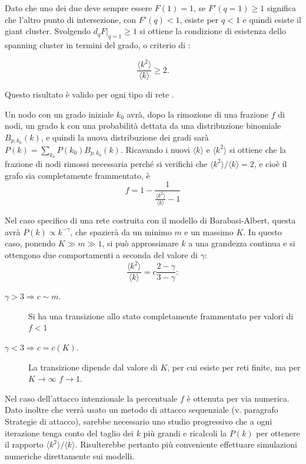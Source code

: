 Dato che uno dei due deve sempre essere $F(1)=1$, se $F'(q=1) \geq 1$ significa che l'altro punto di intersezione, con $F'(q) < 1$, esiste per $q < 1$ e quindi esiste il giant cluster. Svolgendo $d_qF|_{q=1} \geq 1$ si ottiene la condizione di esistenza dello spanning cluster in termini del grado, o criterio di \textcite{Molloy1995}:

\begin{equation}
\label{eq:criterion}
	\frac{\langle k^2\rangle}{\langle k \rangle}\geq 2.
\end{equation}

Questo risultato \`e valido per ogni tipo di rete \parencite{Cohen2000}. 

Un nodo con un grado iniziale $k_0$ avrà, dopo la rimozione di una frazione $f$ di nodi, un grado k con una probabilità dettata da una distribuzione binomiale $B_{p,k_0}(k)$, e quindi la nuova distribuzione dei gradi sarà $P(k) = \sum_{k_0} P(k_0)B_{p,k_0}(k)$. Ricavando i nuovi $\langle k \rangle$ e $\langle k^2 \rangle$ si ottiene che la frazione di nodi rimossi necessaria perché si verifichi che $\langle k^2\rangle/\langle k \rangle = 2$, e cioè il grafo sia completamente frammentato, è
\begin{equation}
f = 1 - \frac{1}{\frac{\langle k^2 \rangle}{\langle k \rangle}-1}
\label{eq:criterionfreq}
\end{equation}

Nel caso specifico di una rete costruita con il modello di Barabasi-Albert, questa avrà $P(k)\propto k^{-\gamma}$, che spazierà da un minimo $m$ e un massimo $K$. In questo caso, ponendo $K\gg m \gg 1$, si può approssimare $k$ a una grandezza continua e si ottengono due comportamenti a seconda del valore di $\gamma$:
$$\frac{\langle k^2\rangle}{\langle k \rangle} = c \frac{2-\gamma}{3-\gamma}:$$
\begin{description}
	\item[$\gamma > 3 \Rightarrow c\sim m.$] Si ha una transizione allo stato completamente frammentato per valori di $f<1$
	\item[$\gamma < 3 \Rightarrow c=c(K).$] La transizione dipende dal valore di $K$, per cui esiste per reti finite, ma per $K \rightarrow \infty$ $f\rightarrow1$.
\end{description}

Nel caso dell'attacco intenzionale la percentuale $f$ è ottenuta per via numerica. Dato inoltre che verrà usato un metodo di attacco sequenziale (v. paragrafo Strategie di attacco), sarebbe necessario uno studio progressivo che a ogni iterazione tenga conto del taglio dei $k$ più grandi e ricalcoli la $P(k)$ per ottenere il rapporto ${\langle k^2 \rangle}/{\langle k \rangle}$\parencite{Cohen2001}. Risulterebbe pertanto più conveniente effettuare simulazioni numeriche direttamente sui modelli.

